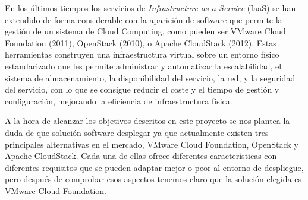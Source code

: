 En los últimos tiempos los servicios de \textit{Infrastructure as a Service} (IaaS) se han extendido de forma considerable con la aparición de software que permite la gestión de un sistema de Cloud Computing, como pueden ser VMware Cloud Foundation (2011), OpenStack (2010), o Apache CloudStack (2012). Estas herramientas construyen una infraestructura virtual sobre un entorno físico estandarizado que les permite administrar y automatizar la escalabilidad, el sistema de almacenamiento, la disponibilidad del servicio, la red, y la seguridad del servicio, con lo que se consigue reducir el coste y el tiempo de gestión y configuración, mejorando la eficiencia de infraestructura física.

A la hora de alcanzar los objetivos descritos en este proyecto se nos plantea la duda de que solución software desplegar ya que actualmente existen tres principales alternativas en el mercado, VMware Cloud Foundation, OpenStack y Apache CloudStack. Cada una de ellas ofrece diferentes características con diferentes requisitos que se pueden adaptar mejor o peor al entorno de despliegue, pero después de comprobar esos aspectos tenemos claro que la \underline{solución elegida es VMware Cloud Foundation}.

